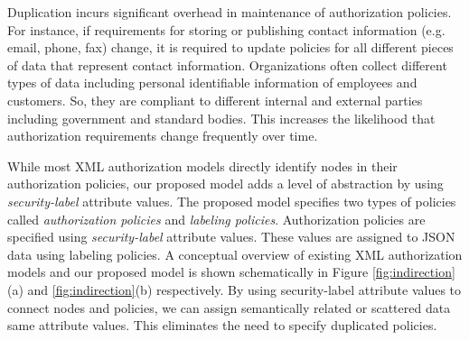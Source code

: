 
Duplication incurs significant overhead in maintenance of authorization policies. For instance, if requirements for storing or publishing contact information (e.g. email, phone, fax) change, it is required to update policies for all different pieces of data that represent contact information. Organizations often collect different types of data including personal identifiable information of employees and customers. So, they are compliant to different internal and external parties including government and standard bodies. This increases the likelihood that authorization requirements change frequently over time. 




While most XML authorization models directly identify nodes in their authorization policies, our proposed model adds a level of abstraction by using \textit{security-label} attribute values. The proposed model specifies two types of policies called \textit{authorization policies} and \textit{labeling policies}.  Authorization policies are specified using \textit{security-label} attribute values. These values are assigned to JSON data using labeling policies. A conceptual overview of existing XML authorization models and our proposed model is  shown schematically in Figure \ref{fig:indirection}(a) and \ref{fig:indirection}(b) respectively. By using security-label attribute values to connect nodes and policies, we can assign semantically related or scattered data same attribute values. This eliminates the need to specify duplicated policies.
	

	
